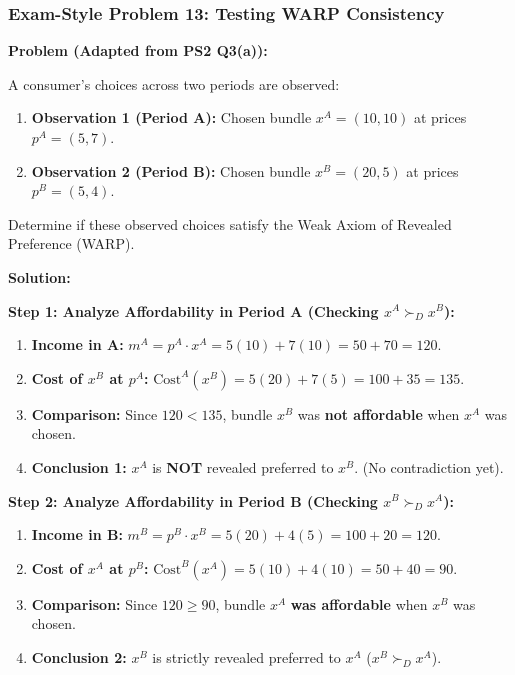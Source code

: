 \documentclass{article}
\begin{document}
\hrulefill

\subsubsection*{Exam-Style Problem 13: Testing WARP Consistency}

\textbf{Problem (Adapted from PS2 Q3(a)):}

A consumer's choices across two periods are observed:

\begin{enumerate}
    \item \textbf{Observation 1 (Period A):} Chosen bundle $x^A = (10, 10)$ at prices $p^A = (5, 7)$.
    \item \textbf{Observation 2 (Period B):} Chosen bundle $x^B = (20, 5)$ at prices $p^B = (5, 4)$.
\end{enumerate}

Determine if these observed choices satisfy the Weak Axiom of Revealed Preference (WARP).

\textbf{Solution:}

\textbf{Step 1: Analyze Affordability in Period A (Checking $x^A \succ_D x^B$):}
\begin{enumerate}
    \item \textbf{Income in A:} $m^A = p^A \cdot x^A = 5(10) + 7(10) = 50 + 70 = 120$.
    \item \textbf{Cost of $x^B$ at $p^A$:} $\text{Cost}^A(x^B) = 5(20) + 7(5) = 100 + 35 = 135$.
    \item \textbf{Comparison:} Since $120 < 135$, bundle $x^B$ was \textbf{not affordable} when $x^A$ was chosen.
    \item \textbf{Conclusion 1:} $x^A$ is \textbf{NOT} revealed preferred to $x^B$. (No contradiction yet).
\end{enumerate}

\textbf{Step 2: Analyze Affordability in Period B (Checking $x^B \succ_D x^A$):}
\begin{enumerate}
    \item \textbf{Income in B:} $m^B = p^B \cdot x^B = 5(20) + 4(5) = 100 + 20 = 120$.
    \item \textbf{Cost of $x^A$ at $p^B$:} $\text{Cost}^B(x^A) = 5(10) + 4(10) = 50 + 40 = 90$.
    \item \textbf{Comparison:} Since $120 \geq 90$, bundle $x^A$ \textbf{was affordable} when $x^B$ was chosen.
    \item \textbf{Conclusion 2:} $x^B$ is strictly revealed preferred to $x^A$ ($x^B \succ_D x^A$).
\end{enumerate}
\end{document}
